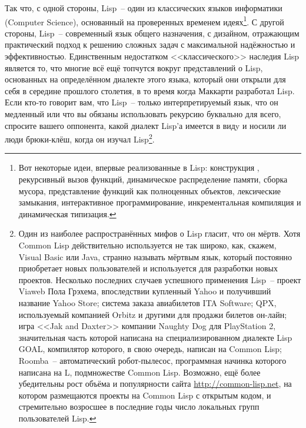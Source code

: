Так что, с одной стороны, Lisp~-- один из классических языков информатики (Computer
Science), основанный на проверенных временем идеях\footnote{Вот некоторые идеи, впервые
  реализованные в Lisp: конструкция , рекурсивный вызов функций, динамическое
  распределение памяти, сборка мусора, представление функций как полноценных объектов,
  лексические замыкания, интерактивное программирование, инкрементальная компиляция и
  динамическая типизация.}. С другой стороны, Lisp~-- современный язык общего назначения,
с дизайном, отражающим практический подход к решению сложных задач с максимальной
надёжностью и эффективностью. Единственным недостатком <<классического>> наследия Lisp
является то, что многие всё ещё топчутся вокруг представлений о Lisp, основанных на
определённом диалекте этого языка, который они открыли для себя в середине прошлого
столетия, в то время когда Маккарти разработал Lisp. Если кто-то говорит вам, что Lisp~--
только интерпретируемый язык, что он медленный или что вы обязаны использовать рекурсию
буквально для всего, спросите вашего оппонента, какой диалект Lisp'а имеется в видy и
носили ли люди брюки-клёш, когда он изучал Lisp\footnote{Один из наиболее распространённых мифов
  о Lisp гласит, что он мёртв.  Хотя Common Lisp действительно используется не так
  широко, как, скажем, Visual Basic или Java, странно называть мёртвым язык, который
  постоянно приобретает новых пользователей и используется для разработки новых
  проектов. Несколько последних случаев успешного применения Lisp~-- проект Viaweb Пола
  Грэхема, впоследствии купленный Yahoo и получивший название Yahoo Store; система
  заказа авиабилетов ITA Software;
  QPX, используемый компанией Orbitz и другими для
  продажи билетов он-лайн; игра <<Jak and Daxter>> компании Naughty Dog для PlayStation 2,
  значительная часть которой написана на специализированном диалекте Lisp GOAL, компилятор которого, в свою
  очередь, написан на Common Lisp; Roomba~-- автоматический робот-пылесос, программная
  начинка которого написана на L, подмножестве Common Lisp. Возможно, ещё более убедительны
  рост объёма и популярности сайта \url{http://common-lisp.net}, на котором
  размещаются проекты на Common Lisp с открытым кодом, и стремительно возросшее в
  последние годы число локальных групп пользователей Lisp.}.

